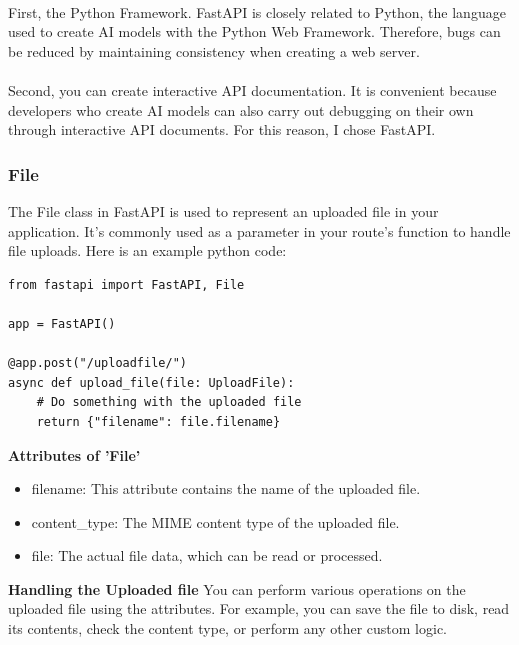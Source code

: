 \\
First, the Python Framework. FastAPI is closely related to Python, the language used to create AI models with the Python Web Framework. Therefore, bugs can be reduced by maintaining consistency when creating a web server.
\\

\\
Second, you can create interactive API documentation. It is convenient because developers who create AI models can also carry out debugging on their own through interactive API documents. For this reason, I chose FastAPI.\\
\subsubsection{\textbf{File}}
The File class in FastAPI is used to represent an uploaded file in your application. It's commonly used as a parameter in your route's function to handle file uploads. Here is an example python code:
\begin{verbatim}
from fastapi import FastAPI, File

app = FastAPI()

@app.post("/uploadfile/")
async def upload_file(file: UploadFile):
    # Do something with the uploaded file
    return {"filename": file.filename}
\end{verbatim}
\textbf{Attributes of 'File'}
\begin{itemize}
    \item filename: This attribute contains the name of the uploaded file.
    \item content\_type: The MIME content type of the uploaded file.
    \item file: The actual file data, which can be read or processed.
\end{itemize}
\textbf{Handling the Uploaded file}
You can perform various operations on the uploaded file using the attributes. For example, you can save the file to disk, read its contents, check the content type, or perform any other custom logic.

